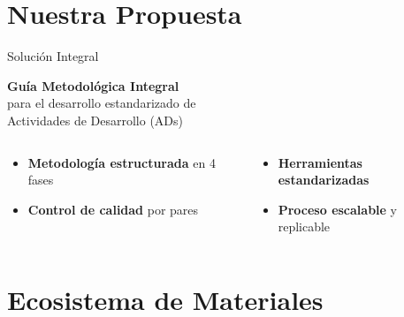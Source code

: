 \documentclass[10pt,aspectratio=169]{beamer}
\begin{document}
\section{Nuestra Propuesta}

\begin{frame}{Solución Integral}
	\begin{center}
		\Large
		\textcolor{azulUTQ}{\textbf{Guía Metodológica Integral}}\\
		\vspace{0.5cm}
		\normalsize
		para el desarrollo estandarizado de\\
		Actividades de Desarrollo (ADs)
	\end{center}
	
	\vspace{1cm}
	
	\begin{columns}
		\begin{column}{0.5\textwidth}
			\begin{itemize}
				\item \textbf{Metodología estructurada} en 4 fases
				\item \textbf{Control de calidad} por pares
			\end{itemize}
		\end{column}
		\begin{column}{0.5\textwidth}
			\begin{itemize}
				\item \textbf{Herramientas estandarizadas}
				\item \textbf{Proceso escalable} y replicable
			\end{itemize}
		\end{column}
	\end{columns}
\end{frame}

\section{Ecosistema de Materiales}
\end{document}
